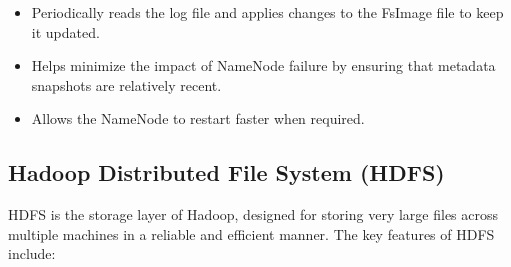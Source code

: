 \documentclass[12pt]{article}
\begin{document}
\begin{itemize}
    \item Periodically reads the log file and applies changes to the FsImage file to keep it updated.
    \item Helps minimize the impact of NameNode failure by ensuring that metadata snapshots are relatively recent.
    \item Allows the NameNode to restart faster when required.
\end{itemize}

\subsection{Hadoop Distributed File System (HDFS)}
HDFS is the storage layer of Hadoop, designed for storing very large files across multiple machines in a reliable and efficient manner. The key features of HDFS include:
\end{document}
